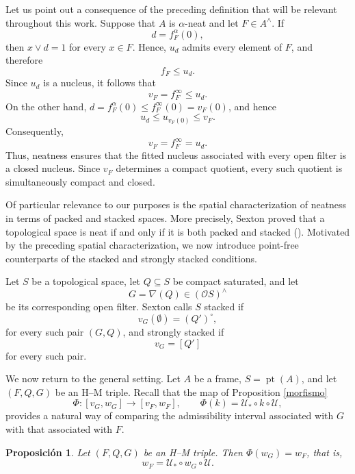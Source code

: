 \documentclass[11pt]{amsart}
\DeclareMathOperator{\pt}{pt}
\theoremstyle{plain}
\newtheorem{prop}[thm]{Proposición}
\theoremstyle{definition}
\begin{document}
Let us point out a consequence of the preceding definition that will be relevant throughout this work. Suppose that \(A\) is \(\alpha\)-neat and let \(F\in A^\wedge\). 
If
\[
d=f_F^\alpha(0),
\]
then \(x\vee d=1\) for every \(x\in F\). Hence, \(u_d\) admits every element of \(F\), and therefore
\[
f_F\leq u_d.
\]
Since \(u_d\) is a nucleus, it follows that
\[
v_F=f_F^\infty\leq u_d.
\]
On the other hand, \(d=f_F^\alpha(0)\leq f_F^\infty(0)=v_F(0)\), and hence
\[
u_d\leq u_{v_F(0)}\leq v_F.
\]
Consequently,
\[
v_F=f_F^\infty=u_d.
\]
Thus, neatness ensures that the fitted nucleus associated with every open filter is a closed nucleus. Since \(v_F\) determines a compact quotient, 
every such quotient is simultaneously compact and closed.

Of particular relevance to our purposes is the spatial characterization of neatness in terms of packed and stacked spaces.
More precisely, Sexton proved that a topological space is neat if and only if it is both packed and stacked (\cite[Theorem 6.2]{sexton2006ordinal}). 
Motivated by the preceding spatial characterization, we now introduce point-free counterparts of the stacked and strongly stacked conditions.

Let \(S\) be a topological space, let \(Q\subseteq S\) be compact saturated, and let
\[
G=\nabla(Q)\in(\mathcal O S)^\wedge
\]
be its corresponding open filter. Sexton calls \(S\) stacked if
\[
v_G(\emptyset)=(Q')^\circ,
\]
for every such pair \((G,Q)\), and strongly stacked if
\[
v_G=[Q']
\]
for every such pair.

We now return to the general setting. Let \(A\) be a frame, \(S=\pt(A)\), and let \((F,Q,G)\) be an H--M triple. Recall that the map of Proposition \eqref{morfismo}
\[
\Phi:[v_G,w_G]\longrightarrow[v_F,w_F],
\qquad
\Phi(k)=\mathcal U_*\circ k\circ\mathcal U,
\]
provides a natural way of comparing the admissibility interval associated with \(G\) with that associated with \(F\).
\begin{prop}\label{igualdadwF}
Let \((F,Q,G)\) be an H--M triple. Then \(\Phi(w_G)=w_F\), that is,
\[
w_F=\mathcal U_*\circ w_G\circ\mathcal U.
\]
\end{prop}
\end{document}
